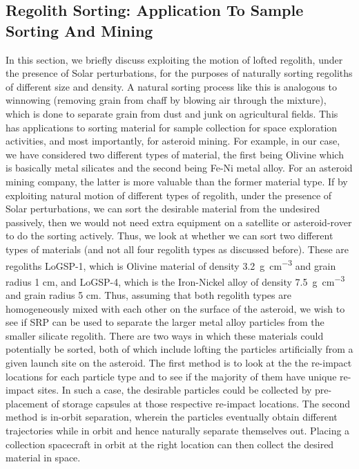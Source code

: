\subsection{Regolith Sorting: Application To Sample Sorting And Mining}
\label{sec:asteroid_mining}
In this section, we briefly discuss exploiting the motion of lofted regolith, under the presence of Solar perturbations, for the purposes of naturally sorting regoliths of different size and density. A natural sorting process like this is analogous to winnowing (removing grain from chaff by blowing air through the mixture), which is done to separate grain from dust and junk on agricultural fields. This has applications to sorting material for sample collection for space exploration activities, and most importantly, for asteroid mining. For example, in our case, we have considered two different types of material, the first being Olivine which is basically metal silicates and the second being Fe-Ni metal alloy. For an asteroid mining company, the latter is more valuable than the former material type. If by exploiting natural motion of different types of regolith, under the presence of Solar perturbations, we can sort the desirable material from the undesired passively, then we would not need extra equipment on a satellite or asteroid-rover to do the sorting actively.
%
\newline\newline
%
Thus, we look at whether we can sort two different types of materials (and not all four regolith types as discussed before). These are regoliths LoGSP-1, which is Olivine material of density \SI{3.2}{\gram\per\centi\metre\cubed} and grain radius 1 cm, and LoGSP-4, which is the Iron-Nickel alloy of density \SI{7.5}{\gram\per\centi\metre\cubed} and grain radius 5 cm. Thus, assuming that both regolith types are homogeneously mixed with each other on the surface of the asteroid, we wish to see if \gls{SRP} can be used to separate the larger metal alloy particles from the smaller silicate regolith. There are two ways in which these materials could potentially be sorted, both of which include lofting the particles artificially from a given launch site on the asteroid. The first method is to look at the the re-impact locations for each particle type and to see if the majority of them have unique re-impact sites. In such a case, the desirable particles could be collected by pre-placement of storage capsules at those respective re-impact locations. The second method is in-orbit separation, wherein the particles eventually obtain different trajectories while in orbit and hence naturally separate themselves out. Placing a collection spacecraft in orbit at the right location can then collect the desired material in space.
